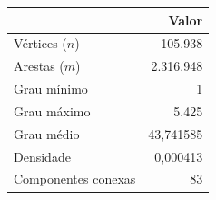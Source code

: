 \begin{tabular}{lr}
\toprule
 & Valor \\
\midrule
Vértices ($n$) & 105.938 \\
Arestas ($m$) & 2.316.948 \\
Grau mínimo & 1 \\
Grau máximo & 5.425 \\
Grau médio & 43,741585 \\
Densidade & 0,000413 \\
Componentes conexas & 83 \\
\bottomrule
\end{tabular}
